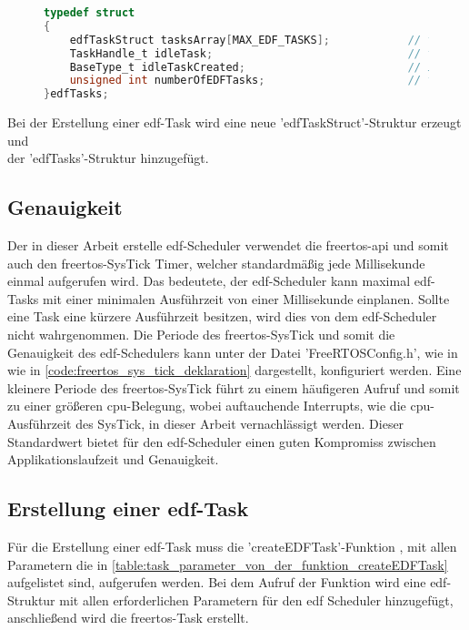 \documentclass[../EDF Master Thesis.tex]{subfiles}
\begin{document}
\begin{figure}[H]
\begin{lstlisting}[language=C, caption=edfTasks Struktur, label=code:edfTasks]
typedef struct
{
    edfTaskStruct tasksArray[MAX_EDF_TASKS];            // tasks array
    TaskHandle_t idleTask;                              // taskhandle idle task
    BaseType_t idleTaskCreated;                         // idle task created?
    unsigned int numberOfEDFTasks;                      // total number of tasks
}edfTasks;
\end{lstlisting}
\end{figure}

Bei der Erstellung einer \ac{edf}-Task wird eine neue 'edfTaskStruct'-Struktur erzeugt und \\der 'edfTasks'-Struktur hinzugefügt.

\subsection{Genauigkeit} \label{section:genauigkeit}

Der in dieser Arbeit erstelle \ac{edf}-Scheduler verwendet die \ac{freertos}-\ac{api} und somit auch den \ac{freertos}-SysTick Timer, welcher standardmäßig jede Millisekunde einmal aufgerufen wird.
Das bedeutete, der \ac{edf}-Scheduler kann maximal \ac{edf}-Tasks mit einer minimalen Ausführzeit von einer Millisekunde einplanen.
Sollte eine Task eine kürzere Ausführzeit besitzen, wird dies von dem \ac{edf}-Scheduler nicht wahrgenommen.
Die Periode des \ac{freertos}-SysTick und somit die Genauigkeit des \ac{edf}-Schedulers kann unter der Datei 'FreeRTOSConfig.h', wie in wie in \autoref{code:freertos_sys_tick_deklaration} dargestellt, konfiguriert werden.
Eine kleinere Periode des \ac{freertos}-SysTick führt zu einem häufigeren Aufruf und somit zu einer größeren \ac{cpu}-Belegung, wobei auftauchende Interrupts, wie die \ac{cpu}-Ausführzeit des SysTick, in dieser Arbeit vernachlässigt werden.
Dieser Standardwert bietet für den \ac{edf}-Scheduler einen guten Kompromiss zwischen Applikationslaufzeit und Genauigkeit.

\clearpage
\subsection{Erstellung einer \acf{edf}-Task} \label{section:erstellung_einer_edf_task}

    Für die Erstellung einer \ac{edf}-Task muss die 'createEDFTask'-Funktion , mit allen Parametern die in \autoref{table:task_parameter_von_der_funktion_createEDFTask} aufgelistet sind, aufgerufen werden.
    Bei dem Aufruf der Funktion wird eine \ac{edf}-Struktur mit allen erforderlichen Parametern für den \ac{edf} Scheduler hinzugefügt, anschließend wird die \ac{freertos}-Task erstellt.
\end{document}
